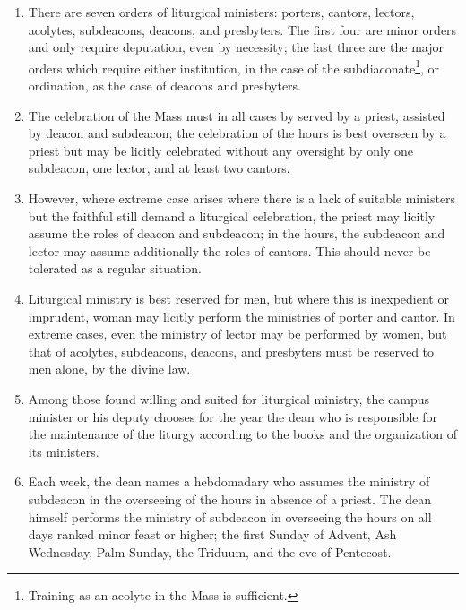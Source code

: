 		\begin{enumerate}
		
			\item There are seven orders of liturgical ministers: porters, cantors, lectors, acolytes, subdeacons, deacons, and presbyters. The first four are minor orders and only require deputation, even by necessity; the last three are the major orders which require either institution, in the case of the subdiaconate\footnote{Training as an acolyte in the Mass is sufficient.}, or ordination, as the case of deacons and presbyters.
			
			\item The celebration of the Mass must in all cases by served by a priest, assisted by deacon and subdeacon; the celebration of the hours is best overseen by a priest but may be licitly celebrated without any oversight by only one subdeacon, one lector, and at least two cantors.
			
			\item However, where extreme case arises where there is a lack of suitable ministers but the faithful still demand a liturgical celebration, the priest may licitly assume the roles of deacon and subdeacon; in the hours, the subdeacon and lector may assume additionally the roles of cantors. This should never be tolerated as a regular situation.
			
			\item Liturgical ministry is best reserved for men, but where this is inexpedient or imprudent, woman may licitly perform the ministries of porter and cantor. In extreme cases, even the ministry of lector may be performed by women, but that of acolytes, subdeacons, deacons, and presbyters must be reserved to men alone, by the divine law.
			
			\item Among those found willing and suited for liturgical ministry, the campus minister or his deputy chooses for the year the dean who is responsible for the maintenance of the liturgy according to the books and the organization of its ministers.
			
			\item Each week, the dean names a hebdomadary who assumes the ministry of subdeacon in the overseeing of the hours in absence of a priest.  The dean himself performs the ministry of subdeacon in overseeing the hours on all days ranked minor feast or higher; the first Sunday of Advent, Ash Wednesday, Palm Sunday, the Triduum, and the eve of Pentecost.
			

\end{enumerate}
